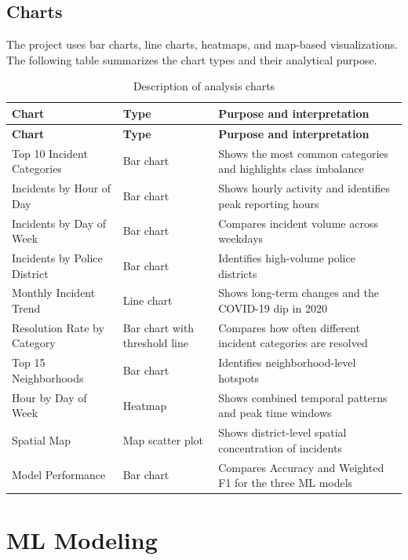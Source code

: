 \documentclass[12pt,a4paper]{article}
\begin{document}
\subsection{Charts}

The project uses bar charts, line charts, heatmaps, and map-based visualizations. The following table summarizes the chart types and their analytical purpose.

\begin{longtable}{L{4cm} L{3cm} L{8cm}}
\caption{Description of analysis charts}\\
\toprule
\textbf{Chart} & \textbf{Type} & \textbf{Purpose and interpretation} \\
\midrule
\endfirsthead
\toprule
\textbf{Chart} & \textbf{Type} & \textbf{Purpose and interpretation} \\
\midrule
\endhead
Top 10 Incident Categories & Bar chart & Shows the most common categories and highlights class imbalance \\
Incidents by Hour of Day & Bar chart & Shows hourly activity and identifies peak reporting hours \\
Incidents by Day of Week & Bar chart & Compares incident volume across weekdays \\
Incidents by Police District & Bar chart & Identifies high-volume police districts \\
Monthly Incident Trend & Line chart & Shows long-term changes and the COVID-19 dip in 2020 \\
Resolution Rate by Category & Bar chart with threshold line & Compares how often different incident categories are resolved \\
Top 15 Neighborhoods & Bar chart & Identifies neighborhood-level hotspots \\
Hour by Day of Week & Heatmap & Shows combined temporal patterns and peak time windows \\
Spatial Map & Map scatter plot & Shows district-level spatial concentration of incidents \\
Model Performance & Bar chart & Compares Accuracy and Weighted F1 for the three ML models \\
\bottomrule
\end{longtable}


\section{ML Modeling}
\end{document}
